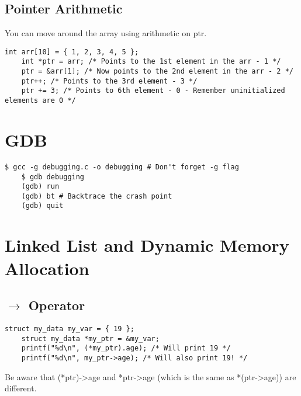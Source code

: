 \documentclass{article}
\begin{document}
\subsection{Pointer Arithmetic}
You can move around the array using arithmetic on ptr.
\begin{lstlisting}[style=CStyle]
    int arr[10] = { 1, 2, 3, 4, 5 };
    int *ptr = arr; /* Points to the 1st element in the arr - 1 */
    ptr = &arr[1]; /* Now points to the 2nd element in the arr - 2 */
    ptr++; /* Points to the 3rd element - 3 */
    ptr += 3; /* Points to 6th element - 0 - Remember uninitialized elements are 0 */
\end{lstlisting}

\section{GDB}
\begin{lstlisting}[style=BashStyle]
    $ gcc -g debugging.c -o debugging # Don't forget -g flag
    $ gdb debugging
    (gdb) run
    (gdb) bt # Backtrace the crash point
    (gdb) quit
\end{lstlisting}

\section{Linked List and Dynamic Memory Allocation}

\subsection{$\rightarrow$ Operator}
\begin{lstlisting}[style=CStyle]
    struct my_data my_var = { 19 };
    struct my_data *my_ptr = &my_var;
    printf("%d\n", (*my_ptr).age); /* Will print 19 */
    printf("%d\n", my_ptr->age); /* Will also print 19! */
\end{lstlisting}
Be aware that (*ptr)-\textgreater age and *ptr-\textgreater age (which is the same as *(ptr-\textgreater age)) are different.
\end{document}
